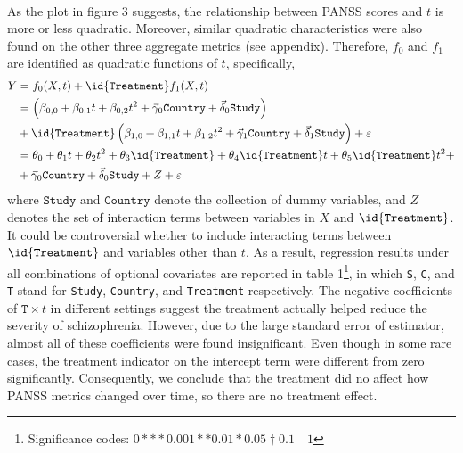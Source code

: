 \documentclass[11pt]{article}
\begin{document}
	\paragraph{} As the plot in figure 3 suggests, the relationship between PANSS scores and $t$ is more or less quadratic. Moreover, similar quadratic characteristics were also found on the other three aggregate metrics (see appendix). Therefore, $f_0$ and $f_1$ are identified as quadratic functions of $t$, specifically,
	\begin{align}
		Y &= f_0(X, t) + \id{\texttt{Treatment}} f_1(X, t) \\
		&= \left(\beta_{0, 0} + \beta_{0, 1} t + \beta_{0, 2} t^2 + \vec{\gamma}_0 \texttt{Country} + \vec{\delta}_0 \texttt{Study}\right) \\
		&+ \id{\texttt{Treatment}} \left(\beta_{1, 0} + \beta_{1, 1} t + \beta_{1, 2} t^2 + \vec{\gamma}_1 \texttt{Country} + \vec{\delta}_1 \texttt{Study}\right) + \varepsilon \\
		&= \theta_0 + \theta_1 t + \theta_2 t^2 + \theta_3 \id{\texttt{Treatment}} + \theta_4 \id{\texttt{Treatment}} t + \theta_5 \id{\texttt{Treatment}} t^2 + \\
		&+\vec{\gamma}_0 \texttt{Country} + \vec{\delta}_0 \texttt{Study} + Z + \varepsilon
	\end{align}
	where $\texttt{Study}$ and $\texttt{Country}$ denote the collection of dummy variables, and $Z$ denotes the set of interaction terms between variables in $X$ and $\id{\texttt{Treatment}}$. It could be controversial whether to include interacting terms between $\id{\texttt{Treatment}}$ and variables other than $t$. As a result, regression results under all combinations of optional covariates are reported in table 1\footnote{Significance codes:  $0 *** 0.001 ** 0.01 * 0.05 \dagger 0.1 \quad 1$}, in which \texttt{S}, \texttt{C}, and \texttt{T} stand for \texttt{Study}, \texttt{Country}, and \texttt{Treatment} respectively. The negative coefficients of $\texttt{T} \times t$ in different settings suggest the treatment actually helped reduce the severity of schizophrenia. However, due to the large standard error of estimator, almost all of these coefficients were found insignificant. Even though in some rare cases, the treatment indicator on the intercept term were different from zero significantly. Consequently, we conclude that the treatment did no affect how PANSS metrics changed over time, so there are no treatment effect.
\end{document}
